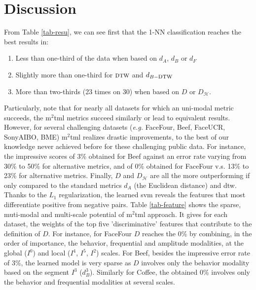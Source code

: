 \section{Discussion}
From Table \ref{tab-resu}, we can see first that the 1-NN classification reaches  the best results in: 
\begin{enumerate}
	\item Less than one-third of the data when based on $d_A$, $d_B$ or $d_F$ 
	\item Slightly more than one-third for  $\mbox{\sc dtw}$ and $d_{B-\mbox{\sc dtw}}$ 
	\item More than two-thirds (23 times on 30)  when based on  $D$ or  $D_{\mathcal{H}}$.
\end{enumerate}
Particularly, note that for nearly all datasets for which an uni-modal metric succeeds,  the {\sc m}$^2${\sc tml} metrics succeed similarly or lead to equivalent results.  
However, for  several challenging datasets ({\it e.g.} FaceFour, Beef, FaceUCR, SonyAIBO, BME) {\sc m}$^2${\sc tml} realizes drastic improvements, to the best of our knowledge never achieved before  for these challenging public data. For instance, the impressive scores of 3\% obtained for Beef against an  error rate  varying from 30\% to 50\% for alternative metrics,   and of 0\% obtained for FaceFour  v.s. 13\% to 23\% for alternative metrics.  Finally, $D$ and $D_{\mathcal{H}}$ are all the more outperforming if only compared to the standard metrics $d_A$ (the Euclidean distance) and {\sc dtw}. \\
Thanks to the $L_1$ regularization, the learned {\sc svm} reveals  the features that most differentiate positive from negative pairs.  Table \ref{tab-feature} shows the sparse, muti-modal and multi-scale potential of {\sc m}$^2${\sc tml} approach.  It gives for each dataset, the weights of the top five 'discriminative' features that contribute to the definition of $D$.  For instance,   for FaceFour $D$ reaches the 0\% by combining, in the order of importance, the behavior,  frequential and amplitude modalities, at the global ($I^0$) and  local ($I^4$, $I^5$, $I^2$) scales. For Beef, besides the impressive error rate of 3\%, the learned model is very sparse as $D$ involves only the behavior modality based on   the segment $I^3$ ($d_B^3$). Similarly for Coffee, the obtained 0\% involves  only the behavior and frequential modalities at several scales. \\ 
